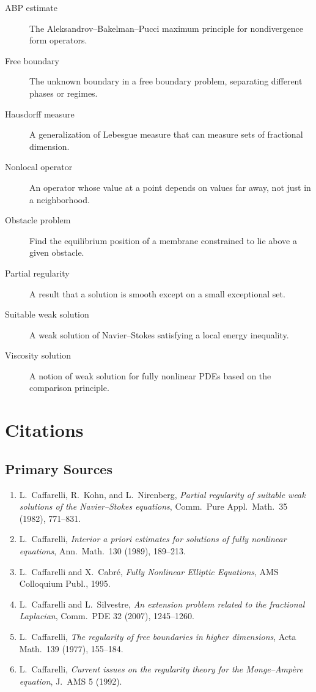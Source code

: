 \begin{description}
    \item[ABP estimate] The Aleksandrov--Bakelman--Pucci maximum principle for nondivergence form operators.
    \item[Free boundary] The unknown boundary in a free boundary problem, separating different phases or regimes.
    \item[Hausdorff measure] A generalization of Lebesgue measure that can measure sets of fractional dimension.
    \item[Nonlocal operator] An operator whose value at a point depends on values far away, not just in a neighborhood.
    \item[Obstacle problem] Find the equilibrium position of a membrane constrained to lie above a given obstacle.
    \item[Partial regularity] A result that a solution is smooth except on a small exceptional set.
    \item[Suitable weak solution] A weak solution of Navier--Stokes satisfying a local energy inequality.
    \item[Viscosity solution] A notion of weak solution for fully nonlinear PDEs based on the comparison principle.
\end{description}

\section{Citations}\subsection*{Primary Sources}
\begin{enumerate}
    \item L.\ Caffarelli, R.\ Kohn, and L.\ Nirenberg, \textit{Partial regularity of suitable weak solutions of the Navier--Stokes equations}, Comm.\ Pure Appl.\ Math.\ 35 (1982), 771--831.
    \item L.\ Caffarelli, \textit{Interior a priori estimates for solutions of fully nonlinear equations}, Ann.\ Math.\ 130 (1989), 189--213.
    \item L.\ Caffarelli and X.\ Cabr\'e, \textit{Fully Nonlinear Elliptic Equations}, AMS Colloquium Publ., 1995.
    \item L.\ Caffarelli and L.\ Silvestre, \textit{An extension problem related to the fractional Laplacian}, Comm.\ PDE 32 (2007), 1245--1260.
    \item L.\ Caffarelli, \textit{The regularity of free boundaries in higher dimensions}, Acta Math.\ 139 (1977), 155--184.
    \item L.\ Caffarelli, \textit{Current issues on the regularity theory for the Monge--Amp\`ere equation}, J.\ AMS 5 (1992).
\end{enumerate}

